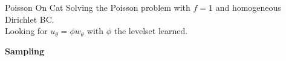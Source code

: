 \begin{frame}{Poisson On Cat}	
	 Solving the Poisson problem with $f=1$ and homogeneous Dirichlet BC. \\
	 Looking for $u_\theta = \phi w_\theta$ with $\phi$ the levelset learned. 
	
	\begin{center}
		\begin{minipage}{0.32\linewidth}
			\textbf{Sampling}
			
			\vspace{-10pt}
			\centering
		\end{minipage} \qquad 
		\begin{minipage}{0.32\linewidth}
			\centering
		\end{minipage} 
	\end{center}

	\begin{center}
	\end{center}
\end{frame}